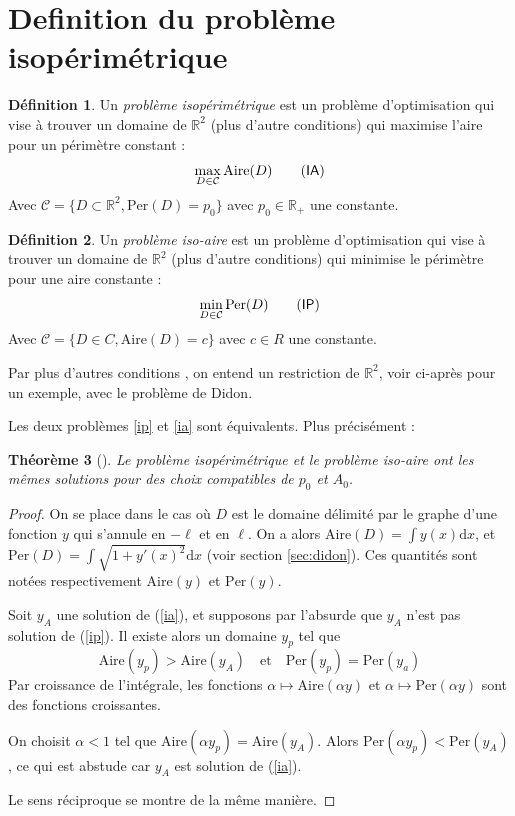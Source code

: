 \documentclass[10pt,a4paper]{article}
\newcommand{\R}{\mathbb{R}}
\newcommand{\C}{\mathcal{C}}
\renewcommand{\d}{\mathrm{d}}
\newcommand{\A}{\mathrm{Aire}}
\newcommand{\p}{\mathrm{Per}}
\newcommand{\IA}{\textsf{IA}}
\newcommand{\IP}{\textsf{IP}}
\renewcommand{\ss}{\vspace*{\baselineskip}}
\theoremstyle{plain}
\newtheorem{thm}{Théorème}[section]
\theoremstyle{definition}
\newtheorem{defi}[thm]{Définition}
\begin{document}
\section{Definition du problème isopérimétrique}

\begin{defi}
Un \emph{problème isopérimétrique} est un problème d'optimisation qui vise à trouver un domaine de $\R^2$ (plus d'autre conditions) qui maximise l'aire pour un périmètre constant :
\[\max_{D \in \C} \A(D) \label{ia}\tag{\IA}\]
Avec $\mathcal{C} = \{ D \subset\R^2, \p(D) = p_0 \}$ avec $p_0\in \R_+$ une constante.


\end{defi}

\begin{defi}
Un \emph{problème iso-aire} est un problème d'optimisation qui vise à trouver un domaine de $\R^2$ (plus d'autre conditions) qui minimise le périmètre pour une aire constante :
\[\min_{D \in \C} \p(D) \label{ip}\tag{\IP}\]
Avec $\mathcal{C} = \{ D \in C, \A(D)=c \}$ avec $c \in R$ une constante.
\end{defi}


Par \og plus d'autres conditions \fg{}, on entend un restriction de $\R^2$, voir ci-après pour un exemple, avec le problème de Didon.

\ss
Les deux problèmes \ref{ip} et \ref{ia} sont équivalents. Plus précisément :

\begin{thm}[\cite{tapia09}]
Le problème isopérimétrique et le problème iso-aire ont les mêmes solutions pour des choix compatibles de $p_0$ et $A_0$.
\end{thm}


\begin{proof}
On se place dans le cas où $D$ est le domaine délimité par le graphe d'une fonction $y$ qui s'annule en $-\ell$ et en $\ell$. On a alors $\A(D)=\int y(x)\d x$, et $\p(D)=\int\sqrt{1+y'(x)^2}\d x$ (voir section \ref{sec:didon}). Ces quantités sont notées respectivement $\A(y)$ et $\p(y)$.

Soit $y_A$ une solution de (\ref{ia}), et supposons par l'absurde que $y_A$ n'est pas solution de (\ref{ip}). Il existe alors un domaine $y_p$ tel que \[\A(y_p)>\A(y_A)\quad\text{et}\quad \p(y_p)=\p(y_a)\]
Par croissance de l'intégrale, les fonctions $\alpha\mapsto\A(\alpha y)$ et $\alpha\mapsto\p(\alpha y)$ sont des fonctions croissantes.

On choisit $\alpha<1$ tel que $\A(\alpha y_p)=\A(y_A)$. Alors $\p(\alpha y_p)<\p(y_A)$, ce qui est abstude car $y_A$ est solution de (\ref{ia}).

Le sens réciproque se montre de la même manière.
\end{proof}
\end{document}
